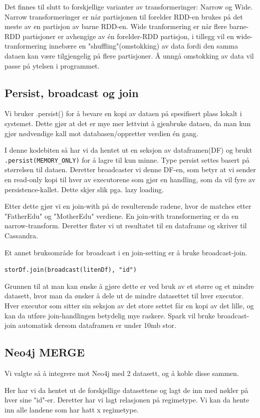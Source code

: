Det finnes til slutt to forskjellige varianter av transformeringer: Narrow og Wide. Narrow transformeringer er når partisjonen til forelder RDD-en brukes på det meste av en partisjon av barne RDD-en. Wide tranformering er når flere barne-RDD partisjoner er avhengige av én forelder-RDD partisjon, i tillegg vil en wide-tranformering innebære en "shuffling"(omstokking) av data fordi den samma dataen kan være tilgjengelig på flere partisjoner. Å unngå omstokking av data vil passe på ytelsen i programmet.

\subsection{Persist, broadcast og join}
Vi bruker .persist() for å bevare en kopi av dataen på spesifisert plass lokalt i systemet. Dette gjør at det er mye mer lettvint å gjenbruke dataen, da man kun gjør nødvendige kall mot databasen/oppretter verdien én gang.


I denne kodebiten så har vi da hentet ut en seksjon av dataframen(DF) og brukt \lstinline{.persist(MEMORY_ONLY)} for å lagre til kun minne. Type persist settes basert på størrelsen til dataen. Deretter broadcaster vi denne DF-en, som betyr at vi sender en read-only kopi til hver av executorene som gjør en handling, som da vil fyre av persistence-kallet. Dette skjer slik pga. lazy loading.

Etter dette gjør vi en join-with på de resulterende radene, hvor de matches etter "FatherEdu" og "MotherEdu" verdiene. En join-with transformering er da en narrow-transform. Deretter flater vi ut resultatet til en dataframe og skriver til Cassandra.

Et annet bruksområde for broadcast i en join-setting er å bruke broadcast-join.

\lstinline {storDf.join(broadcast(litenDf), "id")}

Grunnen til at man kan ønske å gjøre dette er ved bruk av et større og et mindre datasett, hvor man da ønsker å dele ut de mindre datasettet til hver executor. Hver executor som sitter sin seksjon av det store settet får en kopi av det lille, og kan da utføre join-handlingen betydelig mye raskere. Spark vil bruke broadcast-join automatisk dersom dataframen er under 10mb stor.

\subsection{Neo4j MERGE}
Vi valgte så å integrere mot Neo4j med 2 datasett, og å koble disse sammen.


Her har vi da hentet ut de forskjellige datasettene og lagt de inn med nøkler på hver sine "id"-er. Deretter har vi lagt relasjonen på regimetype. Vi kan da hente inn alle landene som har hatt x regimetype.